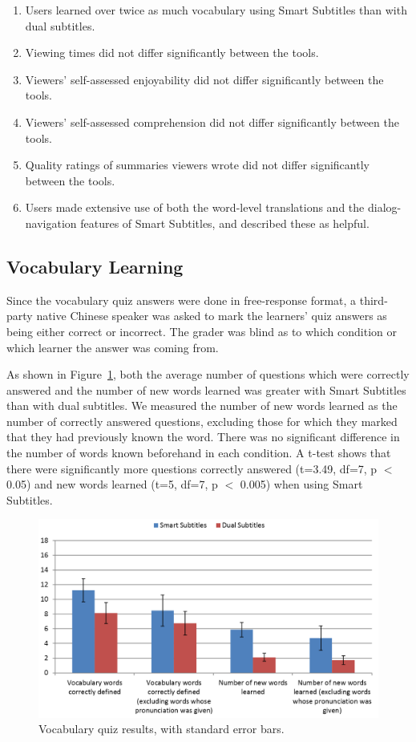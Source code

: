 \documentclass{sigchi}
\begin{document}
\begin{enumerate}[noitemsep]
\item Users learned over twice as much vocabulary using Smart Subtitles than with dual subtitles.
\item Viewing times did not differ significantly between the tools.
\item Viewers' self-assessed enjoyability did not differ significantly between the tools.
\item Viewers' self-assessed comprehension did not differ significantly between the tools.
\item Quality ratings of summaries viewers wrote did not differ significantly
between the tools.
\item Users made extensive use of both the word-level translations and the dialog-navigation features of Smart Subtitles, and described these as helpful.
\end{enumerate}

\subsection{Vocabulary Learning}

Since the vocabulary quiz answers were done in free-response format, a third-party native Chinese speaker was asked to mark the learners' quiz answers as being either correct or incorrect. The grader was blind as to which condition or which learner the answer was coming from.

As shown in Figure~\ref{fig:figure6}, both the average number of questions which were correctly answered and the number of new words learned was greater with Smart Subtitles than with dual subtitles. We measured the number of new words learned as the number of correctly answered questions, excluding those for which they marked that they had previously known the word. There was no significant difference in the number of words known beforehand in each condition. A t-test shows that there were significantly more questions correctly answered (t=3.49, df=7, p $<$ 0.05) and new words learned (t=5, df=7, p $<$ 0.005) when using Smart Subtitles.

\begin{figure}[!h]
\centering
\includegraphics[width=\columnwidth]{vocab-quiz-results}
\caption{Vocabulary quiz results, with standard error bars.}
\label{fig:figure6}
\end{figure}
\end{document}
